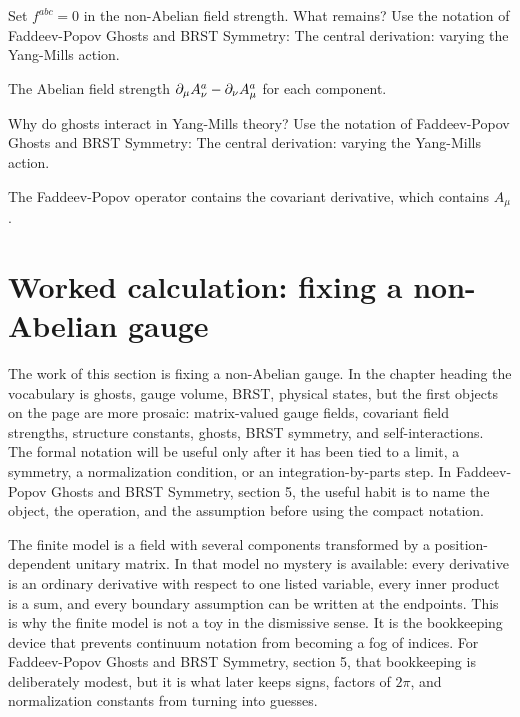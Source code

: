 \begin{exercise}
Set \(f^{abc}=0\) in the non-Abelian field strength.  What remains?  Use the notation of Faddeev-Popov Ghosts and BRST Symmetry: The central derivation: varying the Yang-Mills action.
\begin{answer}
The Abelian field strength \(\partial_\mu A_\nu^a-\partial_\nu A_\mu^a\) for each component.
\end{answer}
\end{exercise}

\begin{exercise}
Why do ghosts interact in Yang-Mills theory?  Use the notation of Faddeev-Popov Ghosts and BRST Symmetry: The central derivation: varying the Yang-Mills action.
\begin{answer}
The Faddeev-Popov operator contains the covariant derivative, which contains \(A_\mu\).
\end{answer}
\end{exercise}



\section{Worked calculation: fixing a non-Abelian gauge}

The work of this section is fixing a non-Abelian gauge.  In the chapter heading the vocabulary is ghosts, gauge volume, BRST, physical states, but the first objects on the page are more prosaic: matrix-valued gauge fields, covariant field strengths, structure constants, ghosts, BRST symmetry, and self-interactions.  The formal notation will be useful only after it has been tied to a limit, a symmetry, a normalization condition, or an integration-by-parts step.  In Faddeev-Popov Ghosts and BRST Symmetry, section 5, the useful habit is to name the object, the operation, and the assumption before using the compact notation.

The finite model is a field with several components transformed by a position-dependent unitary matrix.  In that model no mystery is available: every derivative is an ordinary derivative with respect to one listed variable, every inner product is a sum, and every boundary assumption can be written at the endpoints.  This is why the finite model is not a toy in the dismissive sense.  It is the bookkeeping device that prevents continuum notation from becoming a fog of indices.  For Faddeev-Popov Ghosts and BRST Symmetry, section 5, that bookkeeping is deliberately modest, but it is what later keeps signs, factors of \(2\pi\), and normalization constants from turning into guesses.


